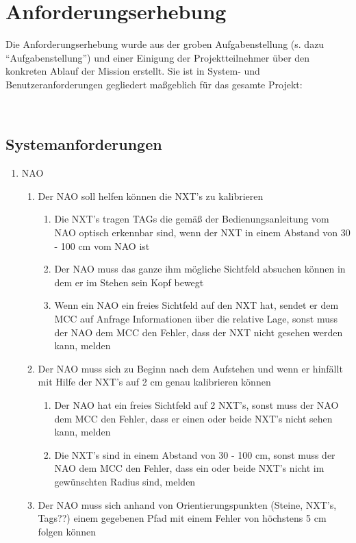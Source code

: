 \chapter{Anforderungserhebung}\label{Anforderungserhebung}

Die Anforderungserhebung wurde aus der groben Aufgabenstellung (s. dazu ``Aufgabenstellung'') und einer Einigung der Projektteilnehmer über den konkreten Ablauf der Mission erstellt. Sie ist in System- und Benutzeranforderungen gegliedert maßgeblich für das gesamte Projekt:

﻿\section{Systemanforderungen}
\begin{enumerate}
    \item NAO
    \begin{enumerate}
        \item Der NAO soll helfen können die NXT's zu kalibrieren
        \begin{enumerate}
            \item Die NXT's tragen TAGs die gemäß der Bedienungsanleitung vom NAO optisch erkennbar sind, wenn der NXT in einem Abstand von 30 - 100 cm vom NAO ist


            \item Der NAO muss das ganze ihm mögliche Sichtfeld absuchen können in dem er im Stehen sein Kopf bewegt

            \item Wenn ein NAO ein freies Sichtfeld auf den NXT hat, sendet er dem MCC auf Anfrage Informationen über die relative Lage, sonst muss der NAO dem MCC den Fehler, dass der NXT nicht gesehen werden kann, melden
        \end{enumerate}
        \item Der NAO muss sich zu Beginn nach dem Aufstehen und wenn er hinfällt mit Hilfe der NXT's auf 2 cm genau kalibrieren können
        \begin{enumerate}
            \item Der NAO hat ein freies Sichtfeld auf 2 NXT's, sonst muss der NAO dem MCC den Fehler, dass er einen oder beide NXT's nicht sehen kann, melden
        
            \item Die NXT's sind in einem Abstand von 30 - 100 cm, sonst muss der NAO dem MCC den Fehler, dass ein oder beide NXT's nicht im gewünschten Radius sind, melden
        \end{enumerate}
        \item Der NAO muss sich anhand von Orientierungspunkten (Steine, NXT's, Tags??) einem gegebenen Pfad mit einem Fehler von höchstens 5 cm folgen können



\end{enumerate}
\end{enumerate}
